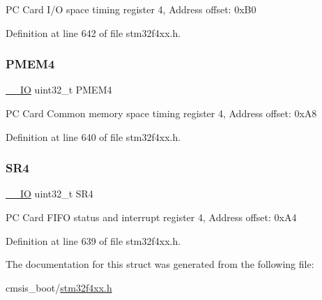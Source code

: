 PC Card I/O space timing register 4, Address offset\+: 0x\+B0 

Definition at line 642 of file stm32f4xx.\+h.

\mbox{\label{struct_f_s_m_c___bank4___type_def_a3f82cc749845fb0dd7dfa8121d96b663}} 
\subsubsection{\texorpdfstring{P\+M\+E\+M4}{PMEM4}}
{\footnotesize\ttfamily \hyperlink{group___c_m_s_i_s__core__definitions_gaec43007d9998a0a0e01faede4133d6be}{\+\_\+\+\_\+\+IO} uint32\+\_\+t P\+M\+E\+M4}

PC Card Common memory space timing register 4, Address offset\+: 0x\+A8 

Definition at line 640 of file stm32f4xx.\+h.

\mbox{\label{struct_f_s_m_c___bank4___type_def_a8218d6e11dae5d4468c69303dec0b4fc}} 
\subsubsection{\texorpdfstring{S\+R4}{SR4}}
{\footnotesize\ttfamily \hyperlink{group___c_m_s_i_s__core__definitions_gaec43007d9998a0a0e01faede4133d6be}{\+\_\+\+\_\+\+IO} uint32\+\_\+t S\+R4}

PC Card F\+I\+FO status and interrupt register 4, Address offset\+: 0x\+A4 

Definition at line 639 of file stm32f4xx.\+h.



The documentation for this struct was generated from the following file\+:\begin{DoxyCompactItemize}
\item 
cmsis\+\_\+boot/\hyperlink{stm32f4xx_8h}{stm32f4xx.\+h}\end{DoxyCompactItemize}
